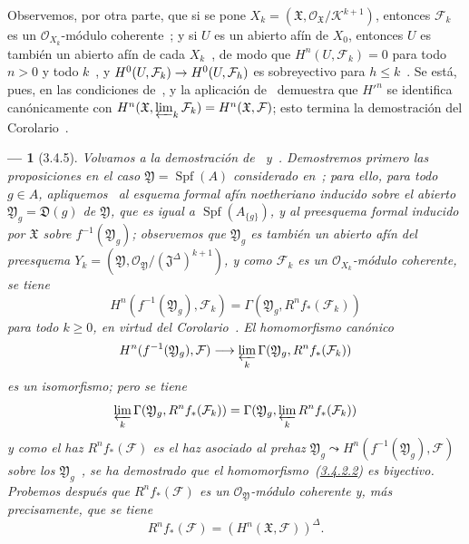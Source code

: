 \documentclass[10pt,oneside,openany]{book}
\theoremstyle{egaenv}\newtheorem*{env}{---}
\theoremstyle{egastatement}
\theoremstyle{egadescription}
\newcommand{\oldpage}[2][]{\marginnote{\normalfont\scriptsize\textbf{#1}\,|\,#2}\ignorespaces}
\renewcommand{\leq}{\leqslant}
\renewcommand{\geq}{\geqslant}
\renewcommand{\to}{\mathchoice{\longrightarrow}{\rightarrow}{\rightarrow}{\rightarrow}}
\begin{document}
Observemos, por otra parte, que si se pone $X_k=(\mathfrak X,\mathcal O_{\mathfrak X}/\mathcal K^{k+1})$, entonces $\mathcal F_k$ es un $\mathcal O_{X_k}$-módulo coherente~; y si $U$ es un abierto afín de $X_0$, entonces $U$ es también un abierto afín de cada $X_k$~, de modo que $H^n(U,\mathcal F_k)=0$ para todo $n>0$ y todo $k$~, y $H^0(U,\mathcal F_k)\to H^0(U,\mathcal F_h)$ es sobreyectivo para $h\leq k$~.
Se está, pues, en las condiciones de~, y la aplicación de~ demuestra que $H'^{n}$ se identifica canónicamente con $H^n(\mathfrak X,\varprojlim_k\mathcal F_k)=H^n(\mathfrak X,\mathcal F)$; esto termina la demostración del Corolario~.

\begin{env}[3.4.5]
\label{III.3.4.5}
\label{III.3.4.5-fr}
Volvamos a la demostración de~ y~.
Demostremos primero las proposiciones en el caso $\mathfrak Y=\operatorname{Spf}(A)$ considerado en~; para ello, para todo $g\in A$, apliquemos~ al esquema formal afín noetheriano inducido sobre el abierto $\mathfrak Y_g=\mathfrak D(g)$ de $\mathfrak Y$, que es igual a $\operatorname{Spf}(A_{\{g\}})$, y al preesquema formal inducido por $\mathfrak X$ sobre $f^{-1}(\mathfrak Y_g)$; observemos que $\mathfrak Y_g$ es también un abierto afín del preesquema $Y_k=(\mathfrak Y,\mathcal O_{\mathfrak Y}/(\mathfrak J^\Delta)^{k+1})$, y como $\mathcal F_k$ es un $\mathcal O_{X_k}$-módulo coherente, se tiene
\[
H^n(f^{-1}(\mathfrak Y_g),\mathcal F_k)
=\Gamma(\mathfrak Y_g,R^nf_*(\mathcal F_k))
\]
para todo $k\geq0$, en virtud del Corolario~.
El homomorfismo canónico
\[
H^n(f^{-1}(\mathfrak Y_g),\mathcal F)
\longrightarrow\varprojlim_k\Gamma(\mathfrak Y_g,R^nf_*(\mathcal F_k))
\]
es un isomorfismo; pero se tiene~
\[
\varprojlim_k\Gamma(\mathfrak Y_g,R^nf_*(\mathcal F_k))
=\Gamma(\mathfrak Y_g,\varprojlim_kR^nf_*(\mathcal F_k))
\]
\oldpage[III]{122}
y como el haz $R^nf_*(\mathcal F)$ es el haz asociado al prehaz $\mathfrak Y_g\leadsto H^n(f^{-1}(\mathfrak Y_g),\mathcal F)$ sobre los $\mathfrak Y_g$~, se ha demostrado que el homomorfismo~(\hyperref[III.3.4.2.2]{3.4.2.2}) es \emph{biyectivo}.
Probemos después que $R^nf_*(\mathcal F)$ es un $\mathcal O_{\mathfrak Y}$-módulo coherente y, más precisamente, que se tiene
\[
R^nf_*(\mathcal F)=(H^n(\mathfrak X,\mathcal F))^\Delta.
\tag{3.4.5.1}\label{III.3.4.5.1-fr}
\]


\end{env}
\end{document}
